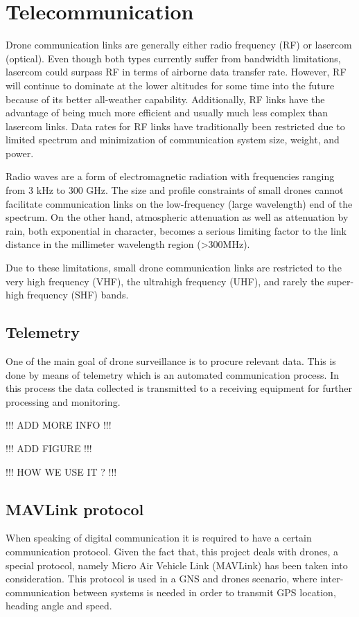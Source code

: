 \chapter{Telecommunication}\label{ch:telecommunication}

Drone communication links are generally either radio frequency (RF) or lasercom (optical). Even though both types currently suffer from bandwidth limitations, lasercom could surpass RF in terms of airborne data transfer rate. However, RF will continue to dominate at the lower altitudes for some time into the future because of its better all-weather capability. Additionally, RF links have the advantage of being much more efficient and usually much less complex than lasercom links.
Data rates for RF links have traditionally been restricted due to limited spectrum and
minimization of communication system size, weight, and power.

Radio waves are a form of electromagnetic radiation with frequencies ranging from 3 kHz to 300 GHz. The size and profile constraints of small drones cannot facilitate communication links on the low-frequency (large wavelength) end of the spectrum. 
On the other hand, atmospheric attenuation as well as attenuation by rain, both
exponential in character, becomes a serious limiting factor to the link distance in
the millimeter wavelength region (>300MHz). 
	
Due to these limitations, small drone communication links are restricted to the very high frequency (VHF), the ultrahigh frequency (UHF), and rarely the super-high frequency (SHF) bands.

\section{Telemetry}
One of the main goal of drone surveillance is to procure relevant data. This is done by means of telemetry which is an automated communication process. In this process the data collected is transmitted to a receiving equipment for further processing and monitoring. 

!!! ADD MORE INFO !!!

!!! ADD FIGURE !!!

!!! HOW WE USE IT ? !!!

\section{MAVLink protocol}
When speaking of digital communication it is required to have a certain communication protocol. Given the fact that, this project deals with drones, a special protocol, namely Micro Air Vehicle Link (MAVLink) has been taken into consideration. This protocol is used in a GNS and drones scenario, where inter-communication between systems is needed in order to transmit GPS location, heading angle and speed.  

